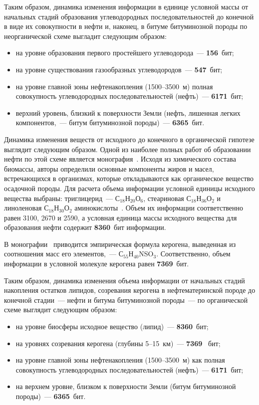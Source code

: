 \begin{multicols}{2}
     Таким образом, динамика изменения информации в единице условной массы 
от начальных стадий образования углеводородных последовательностей до 
конечной в виде их совокупности в нефти и, наконец, в битуме битуминозной 
породы по неорганической схеме выгладит следующим образом:
     \begin{itemize}
\item на уровне образования первого простейшего углеводорода~--- \textbf{156}~бит; 
\item на уровне существования газообразных углеводородов~--- \textbf{547}~бит;
\item на уровне главной зоны нефтенакопления (1500--3500~м) полная 
совокупность углеводородных последовательностей (нефть)~--- 
\textbf{6171}~бит; 
\item верхний уровень, близкий к поверхности Земли (нефть, лишенная легких 
компонентов,~--- битум битуминозной породы)~--- \textbf{6365}~бит. 
     \end{itemize}
     
     Динамика изменения веществ от исходного до конечного в органической 
гипотезе выглядит следующим образом. Одной из наиболее полных работ об 
образовании нефти по этой схеме является монография~\cite{34s}. Исходя из 
химического состава биомассы, авторы определили основные компоненты жиров и 
масел, встречающихся в организмах, которые откладываются как органическое 
вещество осадочной породы. Для расчета объема информации условной единицы 
исходного вещества выбраны: триглицерид~--- С$_{18}$Н$_{20}$О$_6$, стеариновая 
С$_{18}$Н$_{36}$О$_2$ и линоленовая С$_{18}$Н$_{30}$О$_2$ 
аминокислоты~\cite{34s, 13s}. Объем их информации соответственно равен 3100, 
2670 и 2590, а условная единица массы исходного вещества для образования нефти 
содержит \textbf{8360}~бит информации. 
     
     В монографии~\cite{4s} приводится эмпирическая формула керогена, 
выведенная из соотношения масс его элементов,~--- С$_{55}$Н$_{40}$NSO$_3$. 
Соответственно, объем информации в условной молекуле керогена равен 
\textbf{7369}~бит.
     
     Таким образом, динамика изменения объема информации от начальных 
стадий накопления остатков липидов, созревания керогена в нефтематеринской 
породе до конечной стадии~--- нефти и битума битуминозной породы~--- по 
органической схеме выглядит следующим образом: 
     \begin{itemize}
\item на уровне биосферы исходное вещество (липид)~--- \textbf{8360}~бит; 
\item на уровнях созревания керогена (глубины 5--15~км)~--- \textbf{7369}~ бит; 
\item на уровне главной зоны нефтенакопления (1500--3500~м) как полная 
совокупность углеводородных последовательностей (нефть)~--- 
\textbf{6171}~бит; 
\item на верхнем уровне, близком к поверхности Земли (битум битуминозной 
породы)~--- \textbf{6365}~бит. 
     \end{itemize}
     

\end{multicols}
